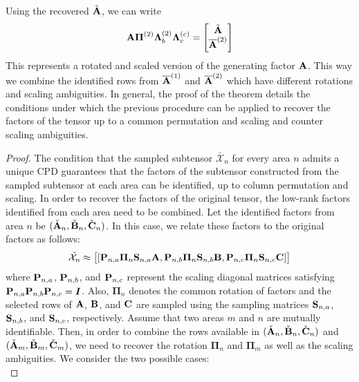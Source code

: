 \documentclass[journal]{IEEEtran}
\newcommand{\A}{{\bf A}}
\newcommand{\B}{{\bf B}}
\newcommand{\C}{{\bf C}}
\newcommand{\Ten}[1]{\mathcal{#1}}
\begin{document}
{Using the recovered $\tilde{\bf A}$, we can write 
\begin{align}
    {\bf A} \boldsymbol{\Pi}^{(2)} \boldsymbol{\Lambda}_b^{(2)} \boldsymbol{\Lambda}_c^{(c)} = \begin{bmatrix} \tilde{\bf A}\\
    \overline{\bf A}^{(2)}
    \end{bmatrix}
\end{align}
This represents a rotated and scaled version of the generating factor ${\bf A}$. This way we combine the identified rows from $\overline{\bf A}^{(1)}$ and $\overline{\bf A}^{(2)}$ which have different rotations and scaling ambiguities. In general, the proof of the theorem details the conditions under which the previous procedure can be applied to recover the factors of the tensor up to a common permutation and scaling and counter scaling ambiguities.
\begin{proof}
The condition that the sampled subtensor $\Ten{\bar{X}}_n$ for every area $n$ admits a unique CPD guarantees that the factors of the subtensor constructed from the sampled subtensor at each area can be identified, up to column permutation and scaling. 
In order to recover the factors of the original tensor, the low-rank factors identified from each area need to be combined. Let the identified factors from area $n$ be $(\check{\A}_n, \check{\B}_n, \check{\C}_n)$. In this case, we relate these factors to the original factors as follows:
\begin{align}
    \check{\Ten{X}_n} \approx \big[[ {\bf P}_{n, a} \boldsymbol{\Pi}_n {\bf S}_{n, a} \A, {\bf P}_{n, b} \boldsymbol{\Pi}_n {\bf S}_{n, b} \B, {\bf P}_{n, c} \boldsymbol{\Pi}_n {\bf S}_{n, c} \C]\big]
\end{align}
where ${\bf P}_{n, a}$, ${\bf P}_{n, b}$, and ${\bf P}_{n, c}$ represent the scaling diagonal matrices satisfying ${\bf P}_{n, a} {\bf P}_{n, b} {\bf P}_{n, c} = \boldsymbol{I}$. Also, $\boldsymbol{\Pi}_n$ denotes the common rotation of factors and the selected rows of $\A$, $\B$, and $\C$ are sampled using the sampling matrices ${\bf S}_{n, a}$, ${\bf S}_{n, b}$, and ${\bf S}_{n, c}$, respectively. Assume that two areas $m$ and $n$ are mutually identifiable. Then, in order to combine the rows available in $(\check{\A}_n, \check{\B}_n, \check{\C}_n)$ and $(\check{\A}_m, \check{\B}_m, \check{\C}_m)$, we need to recover the rotation $\boldsymbol{\Pi}_n$ and $\boldsymbol{\Pi}_m$ as well as the scaling ambiguities. We consider the two possible cases:\\

\end{proof}}
\end{document}
